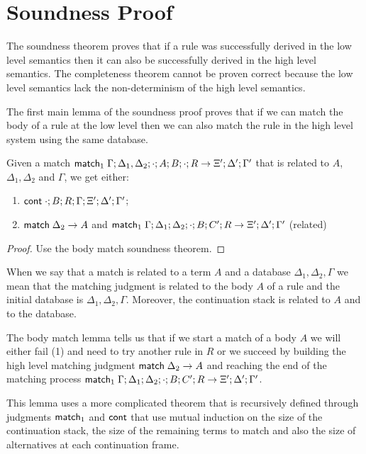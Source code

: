 \section{Soundness Proof}

The soundness theorem proves that if a rule was successfully derived in the low level semantics
then it can also be successfully derived in the high level semantics. The completeness theorem cannot
be proven correct because the low level semantics lack the non-determinism of the high level semantics.

The first main lemma of the soundness proof proves that if we can match the body
of a rule at the low level then we can also match the rule in the high level system using the same database.

\begin{lemma}
   Given a match $\mathsf{match}_1 \; \Gamma; \Delta_1, \Delta_2; \cdot; A; B; \cdot; R \rightarrow \Xi'; \Delta'; \Gamma'$ that is related to $A$, $\Delta_1, \Delta_2$ and $\Gamma$, we get either:
   
   \begin{enumerate}
      \item $\mathsf{cont} \; \cdot; B; R; \Gamma; \Xi'; \Delta'; \Gamma'$;
      \item $\mathsf{match} \; \Delta_2 \rightarrow A$ and $\mathsf{match}_1 \; \Gamma; \Delta_1; \Delta_2; \cdot; B; C'; R \rightarrow \Xi'; \Delta'; \Gamma'$ (related)
   \end{enumerate}
\end{lemma}
\begin{proof}
   Use the body match soundness theorem.
\end{proof}

When we say that a match is related to a term $A$ and a database $\Delta_1, \Delta_2, \Gamma$ we mean that
the matching judgment is related to the body $A$ of a rule and the initial database is $\Delta_1, \Delta_2, \Gamma$. Moreover, the continuation stack is related to $A$ and to the database.

The body match lemma tells us that if we start a match of a body $A$ we will either fail (1) and need to try another rule in $R$ or we succeed by building the high level matching judgment $\mathsf{match} \; \Delta_2 \rightarrow A$ and reaching the end of the matching process $\mathsf{match}_1 \; \Gamma; \Delta_1; \Delta_2; \cdot; B; C'; R \rightarrow \Xi'; \Delta'; \Gamma'$.

This lemma uses a more complicated theorem that is recursively defined through judgments $\mathsf{match}_1$ and $\mathsf{cont}$ that use mutual induction on the size of the continuation stack, the size of the remaining terms
 to match and also the size of alternatives at each continuation frame.
 
